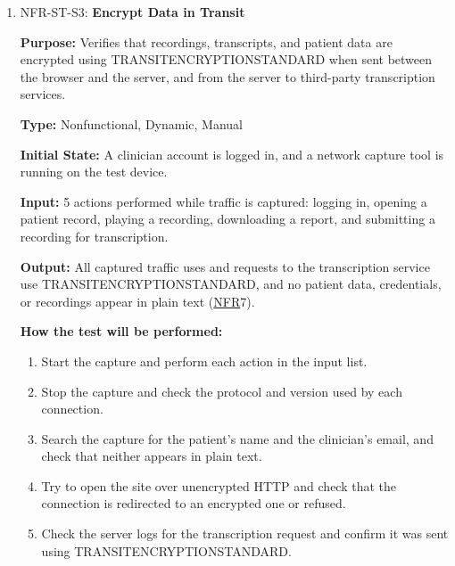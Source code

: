 \documentclass[12pt, titlepage]{article}
\newcommand{\srsnfr}[1]{\href{https://github.com/Nour-Fawaz/MacaBoca/blob/main/pdfs/SRS/SRS.pdf}{NFR}}
\renewcommand{\_}{\oldunderscore\allowbreak}
\begin{document}
\begin{enumerate}
  \item NFR-ST-S3: \textbf{Encrypt Data in Transit\\}
  \begin{mdframed}[linewidth=0.5mm]
      \textbf{Purpose:} Verifies that recordings, transcripts, and patient data are encrypted using TRANSIT\_ENCRYPTION\_STANDARD when sent between the browser and the server, and from the server to third-party transcription services. \par
      \textbf{Type:} Nonfunctional, Dynamic, Manual \par
      \textbf{Initial State:} A clinician account is logged in, and a network capture tool is running on the test device. \par
      \textbf{Input:} 5 actions performed while traffic is captured: logging in, opening a patient record, playing a recording, downloading a report, and submitting a recording for transcription. \par
      \textbf{Output:} All captured traffic uses and requests to the transcription service use TRANSIT\_ENCRYPTION\_STANDARD, and no patient data, credentials, or recordings appear in plain text (\srsnfr*{7}). \par
      \textbf{How the test will be performed:}
      \begin{enumerate}
      \item[1.] Start the capture and perform each action in the input list.
      \item[2.] Stop the capture and check the protocol and version used by each connection.
      \item[3.] Search the capture for the patient's name and the clinician's email, and check that neither appears in plain text.
      \item[4.] Try to open the site over unencrypted HTTP and check that the connection is redirected to an encrypted one or refused.
      \item[5.] Check the server logs for the transcription request and confirm it was sent using TRANSIT\_ENCRYPTION\_STANDARD.
      \end{enumerate}
  \end{mdframed}


\end{enumerate}
\end{document}
